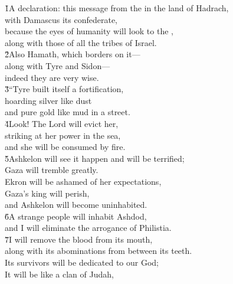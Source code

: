 \begin{poetry}
\poeml {}
\v{1}A declaration: this message from the  in the land of Hadrach, \\
\poemll    with Damascus its confederate, \\
\poeml because the eyes of humanity will look to the , \\
\poemll    along with those of all the tribes of Israel. \\
\poeml \v{2}Also Hamath, which borders on it--- \\
\poemll    along with Tyre and Sidon--- \\
\poemlll       indeed they are very wise. \\
\poeml \v{3}``Tyre built itself a fortification, \\
\poemll    hoarding silver like dust \\
\poemlll       and pure gold like mud in a street. \\
\poeml \v{4}Look! The Lord will evict her, \\
\poemll    striking at her power in the sea, \\
\poemlll       and she will be consumed by fire. \\
\poeml \v{5}Ashkelon will see it happen and will be terrified; \\
\poemll    Gaza will tremble greatly. \\
\poeml Ekron will be ashamed of her expectations, \\
\poemll    Gaza's king will perish, \\
\poemlll       and Ashkelon will become uninhabited. \\
\poeml \v{6}A strange people will inhabit Ashdod, \\
\poemll    and I will eliminate the arrogance of Philistia. \\
\poeml \v{7}I will remove the blood from its mouth, \\
\poemll    along with its abominations from between its teeth. \\
\poeml Its survivors will be dedicated to our God; \\
\poemll    It will be like a clan of Judah, \\

\end{poetry}
